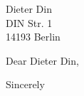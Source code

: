\documentclass{defaultLetter}
\date{ 21.01.1984}
\begin{document}
\begin{letter}{  Dieter Din \\ DIN Str. 1 \\ 14193 Berlin }
\opening{Dear Dieter Din,}\par\addvspace{\medskipamount}\noindent
\lipsum
\vfill
\closing{Sincerely}
\vfill
\end{letter}
\end{document}
